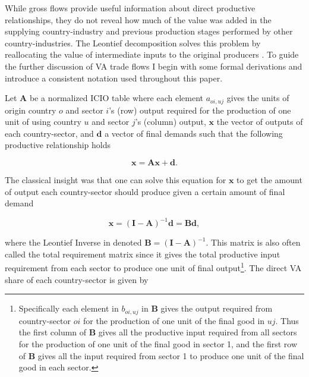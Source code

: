 \documentclass[a4paper]{article}
\begin{document}
While gross flows provide useful information about direct productive relationships, they do not reveal how much of the value was added in the supplying country-industry and previous production stages performed by other country-industries. %
The Leontief decomposition solves this problem by reallocating the value of intermediate inputs to the original producers \citep{Kummritz2014}. To guide the further discussion of VA trade flows I begin with some formal derivations and introduce a consistent notation used throughout this paper. \newline


Let $\textbf{A}$ be a normalized ICIO table where each element $a_{oi,uj}$ gives the units of origin country $o$ and sector $i$'s (row) output required for the production of one unit of using country $u$ and sector $j$'s (column) output, $\textbf{x}$ the vector of outputs of each country-sector, and $\textbf{d}$ a vector of final demands such that the following productive relationship holds

\begin{equation} \label{eq:io_model}
\textbf{x} = \textbf{A}\textbf{x} + \textbf{d}.
\end{equation}

The classical \citet{leontief1936quantitative} insight was that one can solve this equation for $\textbf{x}$ to get the amount of output each country-sector should produce given a certain amount of final demand

\begin{equation} \label{eq:leontief}
\textbf{x} = (\textbf{I}-\textbf{A})^{-1} \textbf{d} = \textbf{B}\textbf{d},
\end{equation}

\noindent where the Leontief Inverse in denoted $\textbf{B} = (\textbf{I}-\textbf{A})^{-1}$. This matrix is also often called the total requirement matrix since it gives the total productive input requirement from each sector to produce one unit of final output\footnote{Specifically each element in $b_{oi,uj}$ in \textbf{B} gives the output required from country-sector $oi$ for the production of one unit of the final good in $uj$. Thus the first column of \textbf{B} gives all the productive input required from all sectors for the production of one unit of the final good in sector 1, and the first row of \textbf{B} gives all the input required from sector 1 to produce one unit of the final good in each sector.}. The direct VA share of each country-sector is given by
\end{document}
